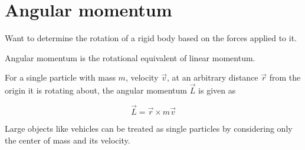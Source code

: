 \section{Angular momentum}

Want to determine the rotation of a rigid body based on the forces applied to it.



Angular momentum is the rotational equivalent of linear momentum.

For a single particle with mass $m$, velocity $\vec{v}$, at an arbitrary distance $\vec{r}$ from the origin it is rotating about, the angular momentum $\vec{L}$ is given as

\begin{equation} \label{eq:angular-momentum}
  \vec{L} = \vec{r} \times m \vec{v}
\end{equation}

Large objects like vehicles can be treated as single particles by considering only the center of mass and its velocity.











